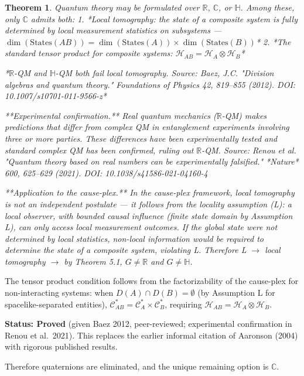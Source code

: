 \documentclass[11pt]{article}
\newtheorem{theorem}{Theorem}[section]
\theoremstyle{definition}
\theoremstyle{remark}
\begin{document}
\begin{theorem}\cite{Baez2012}
\label{theorem:5-1}
Quantum theory may be formulated over $\mathbb{R}$, $\mathbb{C}$, or $\mathbb{H}$. Among these, only $\mathbb{C}$ admits both:
1. *Local tomography: the state of a composite system is fully determined by local measurement statistics on subsystems — $\dim(\mathrm{States}(AB)) = \dim(\mathrm{States}(A)) \times \dim(\mathrm{States}(B))$*
2. *The standard tensor product for composite systems: $\mathcal{H}_{AB} = \mathcal{H}_A \otimes \mathcal{H}_B$*

*$\mathbb{R}$-QM and $\mathbb{H}$-QM both fail local tomography. Source: Baez, J.C. "Division algebras and quantum theory." Foundations of Physics 42, 819–855 (2012). DOI: 10.1007/s10701-011-9566-z*

**Experimental confirmation.** Real quantum mechanics ($\mathbb{R}$-QM) makes predictions that differ from complex QM in entanglement experiments involving three or more parties. These differences have been experimentally tested and standard complex QM has been confirmed, ruling out $\mathbb{R}$-QM. Source: Renou et al. "Quantum theory based on real numbers can be experimentally falsified." *Nature* 600, 625–629 (2021). DOI: 10.1038/s41586-021-04160-4

**Application to the cause-plex.** In the cause-plex framework, local tomography is not an independent postulate — it follows from the locality assumption (L): a local observer, with bounded causal influence (finite state domain by Assumption L), can only access local measurement outcomes. If the global state were not determined by local statistics, non-local information would be required to determine the state of a composite system, violating L. Therefore L $\to$ local tomography $\to$ by Theorem 5.1, $G \neq \mathbb{R}$ and $G \neq \mathbb{H}$.
\end{theorem}

The tensor product condition follows from the factorizability of the
cause-plex for non-interacting systems: when
\(D(A) \cap D(B) = \emptyset\) (by Assumption L for spacelike-separated
entities),
\(\mathcal{C}^{\ast}_{AB} = \mathcal{C}^{\ast}_A \times \mathcal{C}^{\ast}_B\),
requiring \(\mathcal{H}_{AB} = \mathcal{H}_A \otimes \mathcal{H}_B\).

\textbf{Status: Proved} (given Baez 2012, peer-reviewed; experimental
confirmation in Renou et al.~2021). This replaces the earlier informal
citation of Aaronson (2004) with rigorous published results.

Therefore quaternions are eliminated, and the unique remaining option is
\(\mathbb{C}\).
\end{document}

